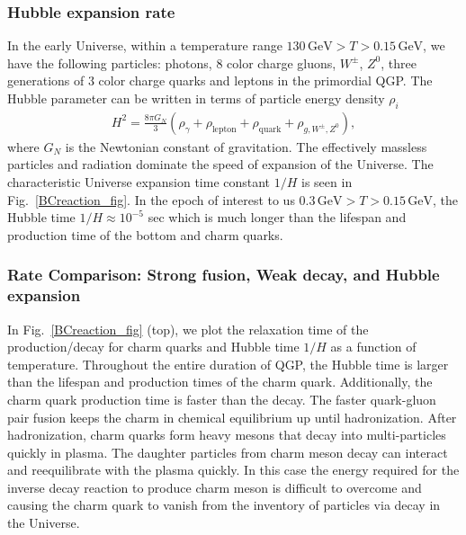 \subsubsection{Hubble expansion rate}
In the early Universe, within a temperature range $130\, \mathrm{GeV}>T>0.15\,\mathrm{GeV}$,  we have the following particles:  photons, $8$ color charge gluons, $W^\pm$, $Z^0$, three generations of $3$ color charge quarks and leptons in the primordial QGP.  The Hubble parameter can be written in terms of particle energy density $\rho_i$
\begin{align}
H^2=\frac{8\pi G_N}{3}\left(\rho_\gamma+\rho_{\mathrm{lepton}}+\rho_{\mathrm{quark}}+\rho_{g,{W^\pm},{Z^0}}\right),
\end{align}
where $G_N$ is the Newtonian constant of gravitation. The effectively massless particles and radiation dominate the speed of expansion of the Universe. The characteristic Universe expansion time constant $1/H$ is seen in Fig.~\ref{BCreaction_fig}. In the epoch of interest to us $0.3\,\mathrm{GeV}>T>0.15\,\mathrm{GeV}$, the Hubble time $1/H\approx10^{-5}$ sec which is much longer than the lifespan and production time of the bottom and charm quarks. 

\subsubsection{Rate Comparison: Strong fusion, Weak decay, and Hubble expansion}
In Fig.~\ref{BCreaction_fig} (top), we plot the relaxation time of the production/decay for charm quarks and Hubble time $1/H$ as a function of temperature. Throughout the entire duration of QGP, the Hubble time is larger than the lifespan and production times of the charm quark. %
Additionally, the charm quark production time is faster than the decay. The faster quark-gluon pair fusion keeps the charm in chemical equilibrium up until hadronization. After hadronization, charm quarks form heavy mesons that decay into multi-particles quickly in plasma. The daughter particles from charm meson decay can interact and reequilibrate with
the plasma quickly. In this case the energy required for the inverse decay reaction to produce
charm meson is difficult to overcome and causing the charm quark to vanish from the inventory of particles via decay in the Universe.

